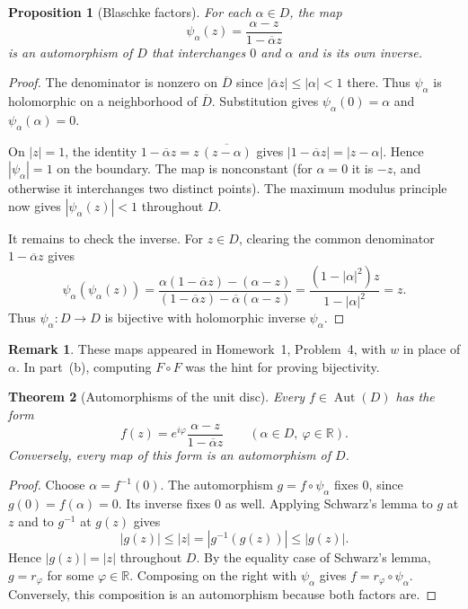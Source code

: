 \documentclass[11pt]{article}
\theoremstyle{plain}
\newtheorem{theorem}{Theorem}[section]
\newtheorem{proposition}[theorem]{Proposition}
\theoremstyle{definition}
\theoremstyle{boldremark}
\newtheorem*{remark}{Remark}
\theoremstyle{remark}
\numberwithin{equation}{section}
\newcommand{\R}{\mathbb{R}}
\begin{document}
\begin{proposition}[Blaschke factors]\label{prop:disc-involution}
For each $\alpha\in D$, the map
\begin{equation}
 \psi_\alpha(z)=\frac{\alpha-z}{1-\overline\alpha z}
\end{equation}
is an automorphism of $D$ that interchanges $0$ and $\alpha$ and is its
own inverse.
\end{proposition}

\begin{proof}
The denominator is nonzero on $\overline D$ since
$|\overline\alpha z|\leq|\alpha|<1$ there. Thus $\psi_\alpha$ is
holomorphic on a neighborhood of $\overline D$. Substitution gives
$\psi_\alpha(0)=\alpha$ and $\psi_\alpha(\alpha)=0$.

On $|z|=1$, the identity $1-\overline\alpha z=z\,\overline{(z-\alpha)}$
gives $|1-\overline\alpha z|=|z-\alpha|$. Hence $|\psi_\alpha|=1$
on the boundary. The map is nonconstant (for $\alpha=0$ it is $-z$,
and otherwise it interchanges two distinct points). The maximum modulus
principle now gives $|\psi_\alpha(z)|<1$ throughout $D$.

It remains to check the inverse. For $z\in D$, clearing the common
denominator $1-\overline\alpha z$ gives
\begin{equation}
 \psi_\alpha(\psi_\alpha(z))
 =\frac{\alpha(1-\overline\alpha z)-(\alpha-z)}
        {(1-\overline\alpha z)-\overline\alpha(\alpha-z)}
 =\frac{(1-|\alpha|^2)z}{1-|\alpha|^2}=z.
\end{equation}
Thus $\psi_\alpha:D\to D$ is bijective with holomorphic inverse
$\psi_\alpha$.
\end{proof}

\begin{remark}
	These maps appeared in Homework~1, Problem~4, with $w$ in place of
	$\alpha$. In part~(b), computing $F\circ F$ was the hint for proving
	bijectivity.
\end{remark}

\begin{theorem}[Automorphisms of the unit disc]\label{thm:disc-automorphisms}
Every $f\in\operatorname{Aut}(D)$ has the form
\begin{equation}
 \boxed{\displaystyle f(z)=e^{i\varphi}
       \frac{\alpha-z}{1-\overline\alpha z}}
 \qquad (\alpha\in D,\ \varphi\in\R).
\end{equation}
Conversely, every map of this form is an automorphism of $D$.
\end{theorem}
\begin{proof}
Choose $\alpha=f^{-1}(0)$. The automorphism $g=f\circ\psi_\alpha$
fixes $0$, since $g(0)=f(\alpha)=0$. Its inverse fixes $0$ as well.
Applying Schwarz's lemma to $g$ at $z$ and to $g^{-1}$ at $g(z)$ gives
\begin{equation}
 |g(z)|\leq|z|=|g^{-1}(g(z))|\leq |g(z)|.
\end{equation}
Hence $|g(z)|=|z|$ throughout $D$. By the equality case of Schwarz's
lemma, $g=r_\varphi$ for some $\varphi\in\R$. Composing on the right
with $\psi_\alpha$ gives $f=r_\varphi\circ\psi_\alpha$. Conversely,
this composition is an automorphism because both factors are.
\end{proof}
\end{document}
